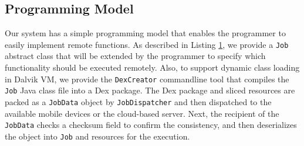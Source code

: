 \documentclass{sig-alternate}[10pt]
\begin{document}
\subsection{Programming Model} \label{prog_model}
Our system has a simple programming model that enables the programmer to easily implement remote functions. As described in Listing \ref{code:job_def}, we provide a \texttt{Job} abstract class that will be extended by the programmer to specify which functionality should be executed remotely. Also, to support dynamic class loading in Dalvik VM, we provide the \texttt{DexCreator} commandline tool that compiles the \texttt{Job} Java class file into a Dex package. The Dex package and sliced resources are packed as a \texttt{JobData} object by \texttt{JobDispatcher} and then dispatched to the available mobile devices or the cloud-based server. Next, the recipient of the \texttt{JobData} checks a checksum field to confirm the consistency, and then deserializes the object into \texttt{Job} and resources for the execution.

\begin{figure}
\noindent {}	
\noindent {}	
\label{code:job_def}
\end{figure}
\end{document}

